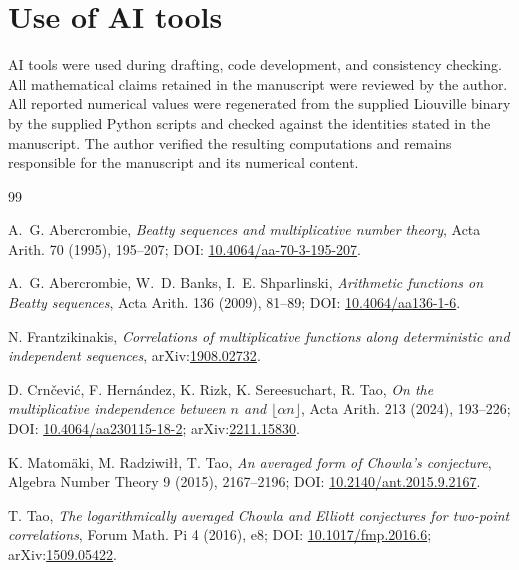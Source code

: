 \documentclass[preprint,12pt]{elsarticle}
\numberwithin{equation}{section}
\theoremstyle{plain}
\theoremstyle{definition}
\theoremstyle{definition}
\theoremstyle{remark}
\begin{document}
\section{Use of AI tools}
\label{sec:ai}

AI tools were used during drafting, code development, and consistency
checking. All mathematical claims retained in the manuscript were reviewed by
the author. All reported numerical values were regenerated from the supplied
Liouville binary by the supplied Python scripts and checked against the
identities stated in the manuscript. The author verified the resulting
computations and remains responsible for the manuscript and its numerical
content.

\begin{thebibliography}{99}
\raggedright

A.~G. Abercrombie,
\textit{Beatty sequences and multiplicative number theory},
Acta Arith. 70 (1995), 195--207; DOI: \href{https://doi.org/10.4064/aa-70-3-195-207}{10.4064/aa-70-3-195-207}.

A.~G. Abercrombie, W.~D. Banks, I.~E. Shparlinski,
\textit{Arithmetic functions on Beatty sequences},
Acta Arith. 136 (2009), 81--89; DOI: \href{https://doi.org/10.4064/aa136-1-6}{10.4064/aa136-1-6}.

N. Frantzikinakis,
\textit{Correlations of multiplicative functions along deterministic and
independent sequences},
arXiv:\href{https://arxiv.org/abs/1908.02732}{1908.02732}.

D. Crn\v{c}evi\'c, F. Hern\'andez, K. Rizk, K. Sereesuchart, R. Tao,
\textit{On the multiplicative independence between $n$ and
$\lfloor \alpha n\rfloor$},
Acta Arith. 213 (2024), 193--226;
DOI: \href{https://doi.org/10.4064/aa230115-18-2}{10.4064/aa230115-18-2};
arXiv:\href{https://arxiv.org/abs/2211.15830}{2211.15830}.

K. Matom\"aki, M. Radziwi{\l}{\l}, T. Tao,
\textit{An averaged form of Chowla's conjecture},
Algebra Number Theory 9 (2015), 2167--2196; DOI: \href{https://doi.org/10.2140/ant.2015.9.2167}{10.2140/ant.2015.9.2167}.

T. Tao,
\textit{The logarithmically averaged Chowla and Elliott conjectures for
two-point correlations},
Forum Math. Pi 4 (2016), e8; DOI: \href{https://doi.org/10.1017/fmp.2016.6}{10.1017/fmp.2016.6};
arXiv:\href{https://arxiv.org/abs/1509.05422}{1509.05422}.


\end{thebibliography}
\end{document}
